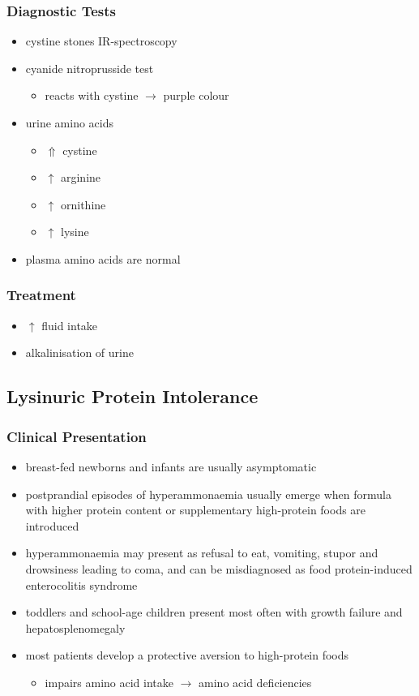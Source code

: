 \documentclass{scrartcl}
\begin{document}
\subsubsection{Diagnostic Tests}
\label{sec:org1f61002}
\begin{itemize}
\item cystine stones IR-spectroscopy
\item cyanide nitroprusside test
\begin{itemize}
\item reacts with cystine \(\to\) purple colour
\end{itemize}
\item urine amino acids
\begin{itemize}
\item \(\Uparrow\) cystine
\item \(\uparrow\) arginine
\item \(\uparrow\) ornithine
\item \(\uparrow\) lysine
\end{itemize}
\item plasma amino acids are normal
\end{itemize}
\subsubsection{Treatment}
\label{sec:orgbf14a45}
\begin{itemize}
\item \(\uparrow\) fluid intake
\item alkalinisation of urine
\end{itemize}

\subsection{Lysinuric Protein Intolerance}
\label{sec:org1cbc6e5}
\subsubsection{Clinical Presentation}
\label{sec:orgb4948e5}
\begin{itemize}
\item breast-fed newborns and infants are usually
asymptomatic
\item postprandial episodes of hyperammonaemia usually emerge when formula
with higher protein content or supplementary high-protein foods are
introduced
\item hyperammonaemia may present as refusal to eat, vomiting, stupor and
drowsiness leading to coma, and can be misdiagnosed as food
protein-induced enterocolitis syndrome
\item toddlers and school-age children present most often with growth
failure and hepatosplenomegaly
\item most patients develop a protective aversion to high-protein foods
\begin{itemize}
\item impairs amino acid intake \(\to\) amino acid deficiencies
\end{itemize}
\end{itemize}
\end{document}
